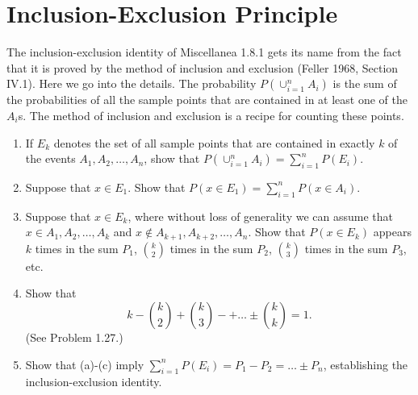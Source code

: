 \section{Inclusion-Exclusion Principle}

\begin{problembox}
The inclusion-exclusion identity of Miscellanea 1.8.1 gets its name from the fact that it is proved by the method of inclusion and exclusion (Feller 1968, Section IV.1). Here we go into the details. The probability $P(\cup_{i=1}^{n}A_{i})$ is the sum of the probabilities of all the sample points that are contained in at least one of the $A_{i}$s. The method of inclusion and exclusion is a recipe for counting these points.
\begin{enumerate}[label=(\alph*)]
    \item If $E_{k}$ denotes the set of all sample points that are contained in exactly $k$ of the events $A_{1},A_{2},\ldots,A_{n}$, show that $P(\cup_{i=1}^{n}A_{i})=\sum_{i=1}^{n}P(E_{i})$.
    \item Suppose that $x\in E_{1}$. Show that $P(x\in E_{1})=\sum_{i=1}^{n}P(x\in A_{i})$.
    \item Suppose that $x\in E_{k}$, where without loss of generality we can assume that $x\in A_{1},A_{2},\ldots,A_{k}$ and $x\notin A_{k+1},A_{k+2},\ldots,A_{n}$. Show that $P(x\in E_{k})$ appears $k$ times in the sum $P_{1}$, $\binom{k}{2}$ times in the sum $P_{2}$, $\binom{k}{3}$ times in the sum $P_{3}$, etc.
    \item Show that \[k-\binom{k}{2}+\binom{k}{3}-+\ldots\pm\binom{k}{k}=1.\] (See Problem 1.27.)
    \item Show that (a)-(c) imply $\sum_{i=1}^{n}P(E_{i})=P_{1}-P_{2}=\ldots\pm P_{n}$, establishing the inclusion-exclusion identity.
\end{enumerate}
\end{problembox}

